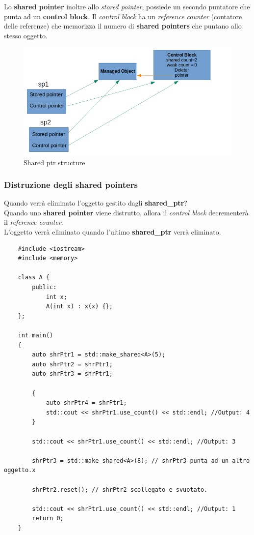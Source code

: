 \textsf{\small Lo \textbf{shared pointer} inoltre allo \emph{stored pointer}, possiede un secondo puntatore che punta ad un \textbf{control block}. Il \emph{control block} ha un \emph{reference counter} (contatore delle referenze) che memorizza il numero di \textbf{shared pointers} che puntano allo stesso oggetto.} \\

\begin{figure}[H]
	\centering
	\includegraphics[width=1.2\textwidth, height=1.2\textheight, keepaspectratio]{./imgs/shared_ptr_structure.png}
	\caption{Shared ptr structure}
	\label{fig:shared_ptr_structure}
\end{figure}

\subsubsection{Distruzione degli shared pointers}

\textsf{\small Quando verrà eliminato l'oggetto gestito dagli \textbf{shared\_ptr}?} \\

\textsf{\small Quando uno \textbf{shared pointer} viene distrutto, allora il \emph{control block} decrementerà il \emph{reference counter}.} \\

\textsf{\small L'oggetto verrà eliminato quando l'ultimo \textbf{shared\_ptr} verrà eliminato.} \\

\begin{lstlisting}
	#include <iostream>
	#include <memory>
	
	class A {
		public:
			int x;
			A(int x) : x(x) {};
	};

	int main()
	{
		auto shrPtr1 = std::make_shared<A>(5);
		auto shrPtr2 = shrPtr1;
		auto shrPtr3 = shrPtr1;
		
		{
			auto shrPtr4 = shrPtr1;
			std::cout << shrPtr1.use_count() << std::endl; //Output: 4
		}
		
		std::cout << shrPtr1.use_count() << std::endl; //Output: 3
		
		shrPtr3 = std::make_shared<A>(8); // shrPtr3 punta ad un altro oggetto.x
		
		shrPtr2.reset(); // shrPtr2 scollegato e svuotato.
		
		std::cout << shrPtr1.use_count() << std::endl; //Output: 1
		return 0;
	}
\end{lstlisting}

